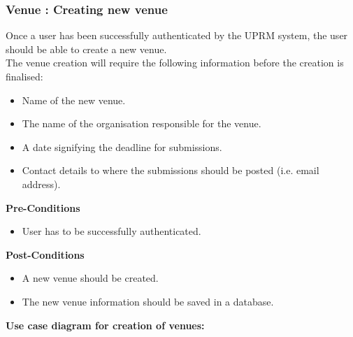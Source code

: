 \subsubsection{Venue : Creating new venue}
	Once a user has been successfully authenticated by the UPRM system, the user should be able to create a new venue.\\ 
	The venue creation will require the following information before the creation is finalised: 
	\begin{itemize}
		\item Name of the new venue.
		\item The name of the organisation responsible for the venue.
		\item A date signifying the deadline for submissions.
		\item Contact details to where the submissions should be posted (i.e. email address).\\
	\end{itemize}
	\textbf{Pre-Conditions}
	\begin{itemize}
		\item User has to be successfully authenticated.\\
	\end{itemize}
	\textbf{Post-Conditions}
	\begin{itemize}
		\item A new venue should be created.
		\item The new venue information should be saved in a database.\\
	\end{itemize}
	\textbf{Use case diagram for creation of venues: }\\
	\centerline{}
	
